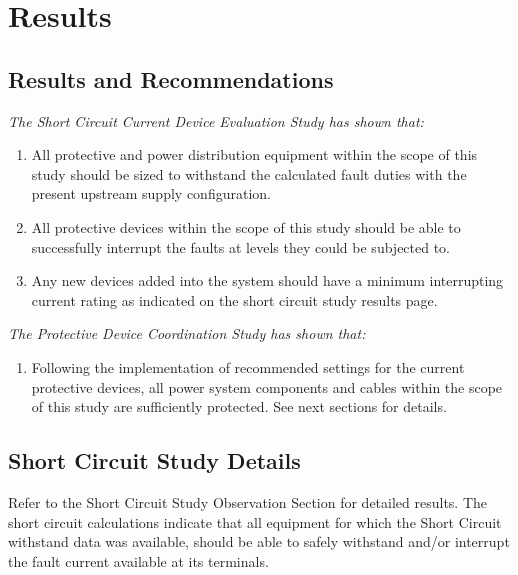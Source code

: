 
\section{Results}
\label{af:results}

\subsection{Results and Recommendations}
\label{af:results:afrr}

\noindent\emph{The Short Circuit Current Device Evaluation Study has shown that:}
\begin{enumerate}
	\item All protective and power distribution equipment within the scope of this study should be sized to withstand the calculated fault duties with the present upstream supply configuration.

	\item All protective devices within the scope of this study should be able to successfully interrupt the faults at levels they could be subjected to.

	\item Any new devices added into the system should have a minimum interrupting current rating as indicated on the short circuit study results page.
\end{enumerate}

\noindent\emph{The Protective Device Coordination Study has shown that:}
\begin{enumerate}
	\item Following the implementation of recommended settings for the current protective devices, all power system components and cables within the scope of this study are sufficiently protected. See next sections for details.
\end{enumerate}

\pagebreak

\subsection{Short Circuit Study Details}
\label{af:results:sccd}

\noindent Refer to the Short Circuit Study Observation Section for detailed results.  The short circuit calculations indicate that all equipment for which the Short Circuit withstand data was available, should be able to safely withstand and/or interrupt the fault current available at its terminals.

